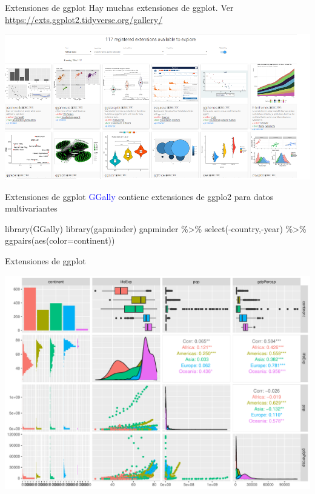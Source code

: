 \documentclass[
  ignorenonframetext,
  aspectratio=169]{beamer}
\newenvironment{Shaded}{\begin{snugshade}}{\end{snugshade}}
\newcommand{\AttributeTok}[1]{\textcolor[rgb]{0.77,0.63,0.00}{#1}}
\newcommand{\FunctionTok}[1]{\textcolor[rgb]{0.00,0.00,0.00}{#1}}
\newcommand{\NormalTok}[1]{#1}
\newcommand{\SpecialCharTok}[1]{\textcolor[rgb]{0.00,0.00,0.00}{#1}}
\newcommand\blue[1]{\textcolor{blue}{#1}}
\begin{document}
\begin{frame}{Extensiones de ggplot}
\protect\hypertarget{extensiones-de-ggplot}{}
Hay muchas extensiones de ggplot. Ver
\url{https://exts.ggplot2.tidyverse.org/gallery/}

\begin{center}\includegraphics[width=0.8\linewidth]{Imgs/extensiones} \end{center}
\end{frame}

\begin{frame}[fragile]{Extensiones de ggplot}
\protect\hypertarget{extensiones-de-ggplot-1}{}
\blue{GGally} contiene extensiones de ggplo2 para datos multivariantes

\begin{Shaded}
\begin{Highlighting}[]
\FunctionTok{library}\NormalTok{(GGally)}
\FunctionTok{library}\NormalTok{(gapminder)}
\NormalTok{gapminder }\SpecialCharTok{\%\textgreater{}\%} \FunctionTok{select}\NormalTok{(}\SpecialCharTok{{-}}\NormalTok{country,}\SpecialCharTok{{-}}\NormalTok{year) }\SpecialCharTok{\%\textgreater{}\%} 
  \FunctionTok{ggpairs}\NormalTok{(}\FunctionTok{aes}\NormalTok{(}\AttributeTok{color=}\NormalTok{continent))}
\end{Highlighting}
\end{Shaded}
\end{frame}

\begin{frame}{Extensiones de ggplot}
\protect\hypertarget{extensiones-de-ggplot-2}{}
\begin{center}\includegraphics[width=0.6\linewidth]{tidyverse_AD_files/figure-beamer/unnamed-chunk-146-1} \end{center}
\end{frame}
\end{document}
